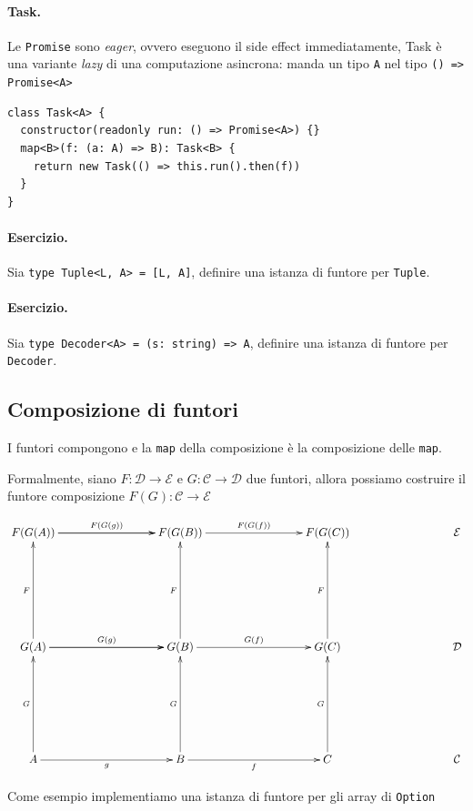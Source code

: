 \documentclass[12pt]{article}
\begin{document}
\paragraph{Task.}

Le \texttt{Promise} sono \emph{eager}, ovvero eseguono il side effect immediatamente, Task è una variante \emph{lazy}
di una computazione asincrona: manda un tipo \texttt{A} nel tipo \texttt{() => Promise<A>}

\begin{verbatim}
class Task<A> {
  constructor(readonly run: () => Promise<A>) {}
  map<B>(f: (a: A) => B): Task<B> {
    return new Task(() => this.run().then(f))
  }
}
\end{verbatim}

\paragraph{Esercizio. } Sia \texttt{type Tuple<L, A> = [L, A]}, definire una istanza di funtore per \texttt{Tuple}.

\paragraph{Esercizio. } Sia \texttt{type Decoder<A> = (s: string) => A}, definire una istanza di funtore per \texttt{Decoder}.

\subsection{Composizione di funtori}

I funtori compongono e la \texttt{map} della composizione è la composizione delle \texttt{map}.

Formalmente, siano $F: \mathcal{D} \rightarrow \mathcal{E}$ e $G: \mathcal{C} \rightarrow \mathcal{D}$ due funtori,
allora possiamo costruire il funtore composizione $F(G): \mathcal{C} \rightarrow \mathcal{E}$

\[
\xymatrixrowsep{3cm}
\xymatrixcolsep{3cm}
\xymatrix{
  F(G(A)) \ar[r]^{F(G(g))} \ar[r] & F(G(B)) \ar[r]^{F(G(f))} & F(G(C)) & \mathcal{E} \\
  G(A) \ar[u]^F \ar[r]^{G(g)} \ar[r] & G(B) \ar[u]^F \ar[r]^{G(f)} & G(C) \ar[u]^F & \mathcal{D} \\
  A \ar[u]^G \ar[r]_g & B \ar[u]^G \ar[r]_f & C \ar[u]^G & \mathcal{C}
}
\]

Come esempio implementiamo una istanza di funtore per gli array di \texttt{Option}
\end{document}
